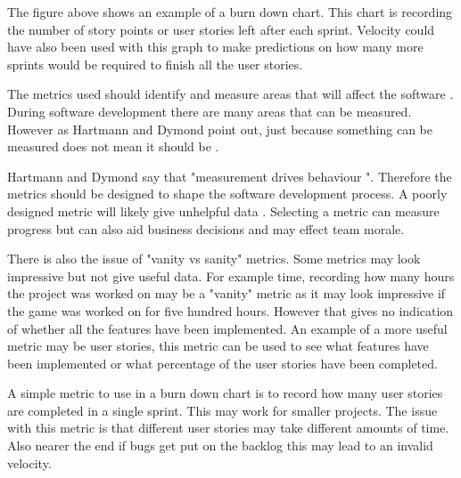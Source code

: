 \documentclass{scrartcl}
\begin{document}
The figure above shows an example of a burn down chart. This chart is recording the number of story points or user stories left after each sprint. Velocity could have also been used with this graph to make predictions on how many more sprints would be required to finish all the user stories.

The metrics used should identify and measure areas that will affect the software \cite{Misra}.
During software development there are many areas that can be measured. However as Hartmann and Dymond point out, just because something can be measured does not mean it should be \cite{Hartmann}.

Hartmann and Dymond say that "measurement drives behaviour "\cite{Hartmann}.  %
Therefore the metrics should be designed to shape the software development process. A poorly designed metric will likely give unhelpful data \cite{Ktata}.  Selecting a metric can measure progress but can also aid business decisions and may effect team morale. %

There is also the issue of "vanity vs sanity" metrics. Some metrics may look impressive but not give useful data. For example time, recording how many hours the project was worked on may be a "vanity" metric as it may look impressive if the game was worked on for five hundred hours. However that gives no indication of whether all the features have been implemented. An example of a more useful metric may be user stories, this metric can be used to see what features have been implemented or what percentage of the user stories have been completed.





A simple metric to use in a burn down chart is to record how many user stories are completed in a single sprint. This may work for smaller projects. The issue with this metric is that different user stories may take different amounts of time. Also nearer the end if bugs get put on the backlog this may lead to an invalid velocity. %

\end{document}
